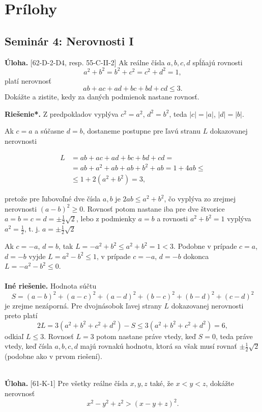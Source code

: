 \documentclass[11pt,a4paper,oneside,final]{book}
\newcommand{\ul}{\textbf{Úloha.} }
\newcommand{\rieh}{\textbf{Riešenie*.} }
\begin{document}
\nocite{*}
\printbibliography

\chapter*{Prílohy}
\label{chap:pril}

\section*{Seminár 4: Nerovnosti I}
\begin{tcolorbox}[breakable,notitle,boxrule=0pt,colback=light-gray,colframe=light-gray]\ul [62-D-2-D4, resp. 55-C-II-2] Ak reálne čísla $a, b, c, d$ spĺňajú rovnosti $$a^2+ b^2= b^2+ c^2= c^2+ d^2= 1,$$
platí nerovnosť
$$ab + ac + ad + bc + bd + cd \leq 3.$$
Dokážte a zistite, kedy za daných podmienok nastane rovnosť.

\end{tcolorbox}

\rieh Z predpokladov vyplýva $c^2 = a^2$, $d^2= b^2$, teda $|c| = |a|$, $|d| = |b|$.

Ak $c = a$ a súčasne $d = b$, dostaneme postupne pre ľavú stranu $L$ dokazovanej
nerovnosti
\vspace{-25pt}
\begin{center}
\begin{align*}
L &= ab + ac + ad + bc + bd + cd =\\
 &= ab + a^2 + ab + ab + b^2 + ab = 1 + 4ab \leq \\
&\leq 1 + 2(a^2 + b^2 ) = 3,
\end{align*}
\end{center}
pretože pre ľubovoľné dve čísla $a, b$ je $2ab \leq a^2 + b^2$, čo vyplýva zo zrejmej nerovnosti $(a -b)^2 \geq 0$. Rovnosť potom nastane iba pre dve štvorice $a = b = c = d =\pm\frac{1}{2}\sqrt{2}$, lebo z podmienky $a = b$ a rovnosti $a^2 + b^2 = 1$ vyplýva $a^2 =\frac{1}{2}$, t. j. $a = \pm \frac{1}{2}\sqrt{2}$

Ak $c = -a$, $d = b$, tak $L = -a^2 + b^2 \leq a^2 + b^2 = 1 < 3$. Podobne v prípade $c = a$,
$d = -b$ vyjde $L = a^2 - b^2 \leq 1$, v prípade $c = -a$, $d = -b$ dokonca $L = -a^2 - b^2 \leq 0$.\\
\\
\textbf{Iné riešenie.} Hodnota súčtu
$$S = (a - b)^2 + (a - c)^2 + (a - d)^2 + (b - c)^2 + (b - d)^2 + (c - d)^2$$
je zrejme nezáporná. Pre dvojnásobok ľavej strany $L$ dokazovanej nerovnosti preto platí
$$2L = 3(a^2 + b^2 + c^2 + d^2 ) - S \leq 3(a^2 + b^2 + c^2 + d^2 ) = 6,$$
odkiaľ $L \leq 3$. Rovnosť $L = 3$ potom nastane práve vtedy, keď $S = 0$, teda práve vtedy, keď čísla $a, b, c, d$ majú rovnakú hodnotu, ktorá sa však musí rovnať $\pm \frac{1}{2}\sqrt{2}$ (podobne ako v prvom riešení).\\
\\
\begin{tcolorbox}[breakable,notitle,boxrule=0pt,colback=light-gray,colframe=light-gray]\ul [61-K-1]
Pre všetky reálne čísla $x, y, z$ také, že $x < y < z$, dokážte nerovnosť $$x^2 - y^2
+ z^2> (x - y + z)^2.$$

\end{tcolorbox}
\end{document}
